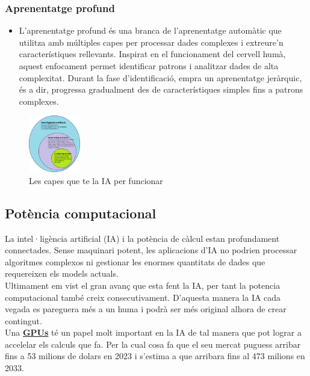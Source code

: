 \subsubsection{Aprenentatge profund}
\begin{itemize}
    \item L'aprenentatge profund és una branca de l'aprenentatge automàtic que utilitza  amb múltiples capes per processar dades complexes i extreure'n característiques rellevants. Inspirat en el funcionament del cervell humà, aquest enfocament permet identificar patrons i analitzar dades de alta complexitat. Durant la fase d'identificació, empra un aprenentatge jeràrquic, és a dir, progressa gradualment des de característiques simples fins a patrons complexes.
\end{itemize}



\begin{figure}[h!]
    \centering
    \includegraphics[width=0.2\textwidth]{./figures/Aprenentatge.png}
    \caption{Les capes que te la IA per funcionar}
\end{figure}


\subsection{Potència computacional}\label{subsec:Potència computacional}
La intel·ligència artificial (IA) i la potència de càlcul estan profundament connectades. Sense maquinari potent, les aplicacions d’IA no podrien processar algoritmes complexos ni gestionar les enormes quantitats de dades que requereixen els models actuals. \\

Ultimament em vist el gran avanç que esta fent la IA, per tant la potencia computacional també creix consecutivament. D'aquesta manera la IA cada vegada es pareguera més a un huma i podrà ser més original alhora de crear contingut.\\

Una \hyperref[GPUs]{\textbf{GPUs}} té un papel molt important en la IA de tal manera que pot lograr a accelelar els calculs que fa. Per la cual cosa fa que el seu mercat puguess arribar fins a 53 milions de dolars en 2023 i s'estima a que arribara fins al 473 milions en 2033.\\

